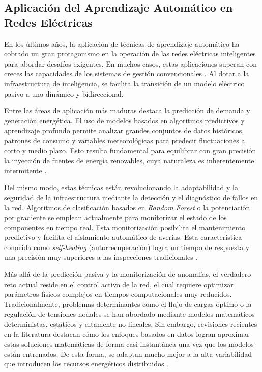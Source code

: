\subsection{Aplicación del Aprendizaje Automático en Redes Eléctricas}
En los últimos años, la aplicación de técnicas de aprendizaje automático ha cobrado un gran protagonismo en la operación de las redes eléctricas inteligentes para abordar desafíos exigentes. En muchos casos, estas aplicaciones superan con creces las capacidades de los sistemas de gestión convencionales \cite{useful-application-smart-grids-ieee}. Al dotar a la infraestructura de inteligencia, se facilita la transición de un modelo eléctrico pasivo a uno dinámico y bidireccional.

Entre las áreas de aplicación más maduras destaca la predicción de demanda y generación energética. El uso de modelos basados en algoritmos predictivos y aprendizaje profundo permite analizar grandes conjuntos de datos históricos, patrones de consumo y variables meteorológicas para predecir fluctuaciones a corto y medio plazo. Esto resulta fundamental para equilibrar con gran precisión la inyección de fuentes de energía renovables, cuya naturaleza es inherentemente intermitente \cite{load-forecasting-2024}.

Del mismo modo, estas técnicas están revolucionando la adaptabilidad y la seguridad de la infraestructura mediante la detección y el diagnóstico de fallos en la red. Algoritmos de clasificación basados en \textit{Random Forest} o la potenciación por gradiente se emplean actualmente para monitorizar el estado de los componentes en tiempo real. Esta monitorización posibilita el mantenimiento predictivo y facilita el aislamiento automático de averías. Esta característica conocida como \textit{self-healing} (autorrecuperación) logra un tiempo de respuesta y una precisión muy superiores a las inspecciones tradicionales \cite{fault-detection-2024}.

Más allá de la predicción pasiva y la monitorización de anomalías, el verdadero reto actual reside en el control activo de la red, el cual requiere optimizar parámetros físicos complejos en tiempos computacionales muy reducidos. Tradicionalmente, problemas determinantes como el flujo de cargas óptimo o la regulación de tensiones nodales se han abordado mediante modelos matemáticos deterministas, estáticos y altamente no lineales. Sin embargo, revisiones recientes en la literatura destacan cómo los enfoques basados en datos logran aproximar estas soluciones matemáticas de forma casi instantánea una vez que los modelos están entrenados. De esta forma, se adaptan mucho mejor a la alta variabilidad que introducen los recursos energéticos distribuidos \cite{review-machine-learning}.

